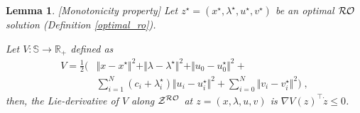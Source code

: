 \documentclass[journal,twoside,web]{ieeecolor}
\newtheorem{lemma}{Lemma}
\begin{document}
\begin{lemma} \label{monotonicity} [Monotonicity property]
Let $z^\star=(x^\star,\lambda^\star,u^\star, v^\star)$ be an optimal ${\cal RO}$ solution (Definition \ref{optimal_ro}).

 Let  $V: {\mathbb S}\to \mathbb{R}_+ $ defined as
\begin{align}
V=\frac{1}{2}\big( &\Vert x-x^\star\Vert^2+\Vert\lambda-\lambda^\star \Vert^2+\Vert u_0-u_0^\star\Vert^2+\nonumber \\
&\sum_{i=1}^N(c_i+\lambda_i^\star) \Vert u_i-u_i^\star\Vert^2+ \sum_{i=0}^N\Vert v_i-v_i^\star\Vert^2\big)\;, \label{Lya_function}
\end{align}
then, the Lie-derivative of $V$ along ${\cal Z}^{\cal RO}$ at $z=(x,\lambda,u,v)$ is $\nabla V(z)^\top \dot z\leq 0$.
\end{lemma}
\end{document}
